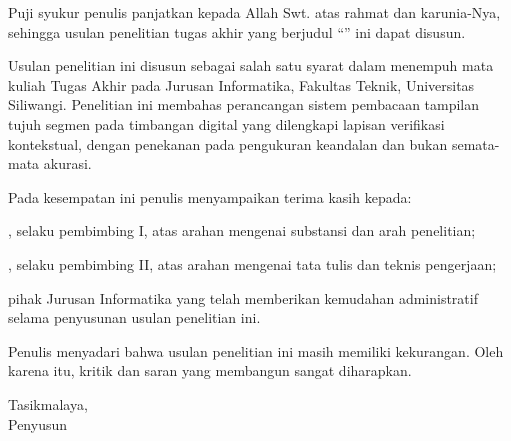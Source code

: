 
Puji syukur penulis panjatkan kepada Allah Swt. atas rahmat dan karunia-Nya,
sehingga usulan penelitian tugas akhir yang berjudul
``\JudulTA'' ini dapat disusun.

Usulan penelitian ini disusun sebagai salah satu syarat dalam menempuh mata
kuliah Tugas Akhir pada Jurusan Informatika, Fakultas Teknik, Universitas
Siliwangi. Penelitian ini membahas perancangan sistem pembacaan tampilan tujuh
segmen pada timbangan digital yang dilengkapi lapisan verifikasi kontekstual,
dengan penekanan pada pengukuran keandalan dan bukan semata-mata akurasi.

Pada kesempatan ini penulis menyampaikan terima kasih kepada:
\begin{poin}
  \item \NamaPembimbingSatu, selaku pembimbing I, atas arahan mengenai
        substansi dan arah penelitian;
  \item \NamaPembimbingDua, selaku pembimbing II, atas arahan mengenai tata
        tulis dan teknis pengerjaan;
  \item pihak Jurusan Informatika yang telah memberikan kemudahan administratif
        selama penyusunan usulan penelitian ini.
\end{poin}

Penulis menyadari bahwa usulan penelitian ini masih memiliki kekurangan. Oleh
karena itu, kritik dan saran yang membangun sangat diharapkan.

\vspace{1\baselineskip}
\begin{flushright}
Tasikmalaya, \BulanTahun\\
Penyusun
\end{flushright}
